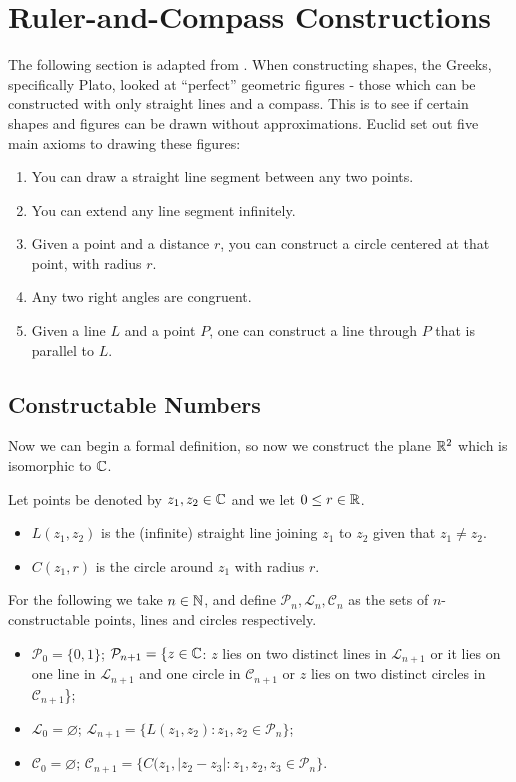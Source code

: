 \section{Ruler-and-Compass Constructions} \label{sec:applications}

The following section is adapted from \cite{Stewart, shape-constructions}. When constructing shapes, the Greeks, specifically Plato, looked at ``perfect'' geometric figures - those which can be constructed with only straight lines and a compass. This is to see if certain shapes and figures can be drawn without approximations. Euclid set out five main axioms to drawing these figures:

\begin{enumerate}
    \item You can draw a straight line segment between any two points.
    \item You can extend any line segment infinitely.
    \item Given a point and a distance $r$, you can construct a circle centered at that point, with radius $r$.
    \item Any two right angles are congruent.
    \item Given a line $L$ and a point $P$, one can construct a line through $P$ that is parallel to $L$. 
\end{enumerate}

\subsection{Constructable Numbers}

Now we can begin a formal definition, so now we construct the plane $\mathbb R^2$ which is isomorphic to $\mathbb C$. 
\begin{definition}
Let points be denoted by $z_1,z_2 \in \mathbb C$ and we let $0\leq r \in \mathbb R$.
    \begin{itemize}
        \item $L(z_1,z_2)$ is the (infinite) straight line joining $z_1$ to $z_2$ given that $z_1 \neq z_2$. 
        \item $C(z_1,r)$ is the circle around $z_1$ with radius $r$.
    \end{itemize}
    For the following we take $n \in \mathbb N$, and define $\mathcal{P}_n,\mathcal{L}_n,\mathcal{C}_n$ as the sets of $n$-constructable points, lines and circles respectively.
    \begin{itemize}
        \item $\mathcal{P}_0=\{0,1\}$; $\mathcal{P}_{n+1}=\{z\in \mathbb C $: $z$ lies on two distinct lines in $\mathcal{L}_{n+1}$ or it lies on one line in $\mathcal{L}_{n+1}$ and one circle in $\mathcal{C}_{n+1}$ or $z$ lies on two distinct circles in $\mathcal{C}_{n+1}$\};
        \item $\mathcal{L}_0=\varnothing$; $\mathcal{L}_{n+1}=\{L(z_1,z_2) : z_1,z_2\in \mathcal{P}_n\}$;
        \item $\mathcal{C}_0=\varnothing$; $\mathcal{C}_{n+1}=\{C(z_1,|z_2-z_3|:z_1,z_2,z_3\in \mathcal{P}_n\}$.
    \end{itemize}
\end{definition}

